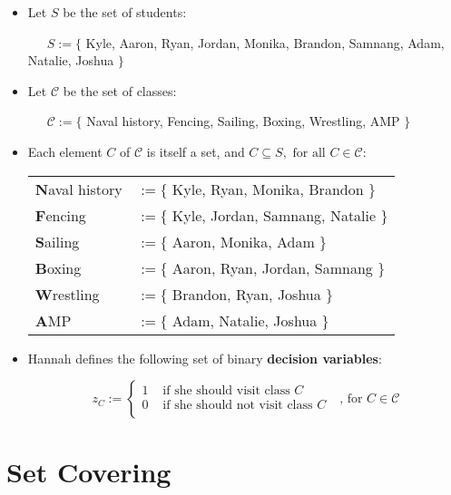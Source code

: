 \documentclass[11pt]{article}
\theoremstyle{definition}
\begin{document}
\bigskip
\begin{itemize}
\item Let $S$ be the set of students:

~~~$S := \{$ Kyle, Aaron, Ryan, Jordan, Monika, Brandon, Samnang, Adam, Natalie, Joshua $\}$

\item Let $\mathcal{C}$ be the set of classes:

~~~$\mathcal{C} := \{$ Naval history, Fencing, Sailing, Boxing, Wrestling, AMP $\}$

\item Each element $C$ of $\mathcal{C}$ is itself a set, and $C \subseteq S, \text{ for all } C \in \mathcal{C}$:
\begin{center}
\begin{tabular}{ll}
{\bf N}aval history &$:= \{$ Kyle, Ryan, Monika, Brandon $\}$\\
{\bf F}encing &$:= \{$ Kyle, Jordan, Samnang, Natalie $\}$\\
{\bf S}ailing &$:= \{$ Aaron, Monika, Adam $\}$\\
{\bf B}oxing &$:= \{$ Aaron, Ryan, Jordan, Samnang $\}$\\
{\bf W}restling &$:= \{$ Brandon, Ryan, Joshua $\}$\\
{\bf A}MP &$:= \{$ Adam, Natalie, Joshua $\}$\\
\end{tabular}
\end{center}

\bigskip
\item Hannah defines the following set of binary \textbf{decision variables}:

\[
z_C := \left\{ \begin{array}{ll}
1 & \text{ if she should visit class $C$ } \\
0 & \text{ if she should not visit class $C$ } \\
\end{array} \right. \text{, for $C \in \mathcal{C}$}
\]

%
\end{itemize}
\newpage
\section{Set Covering}
\end{document}
